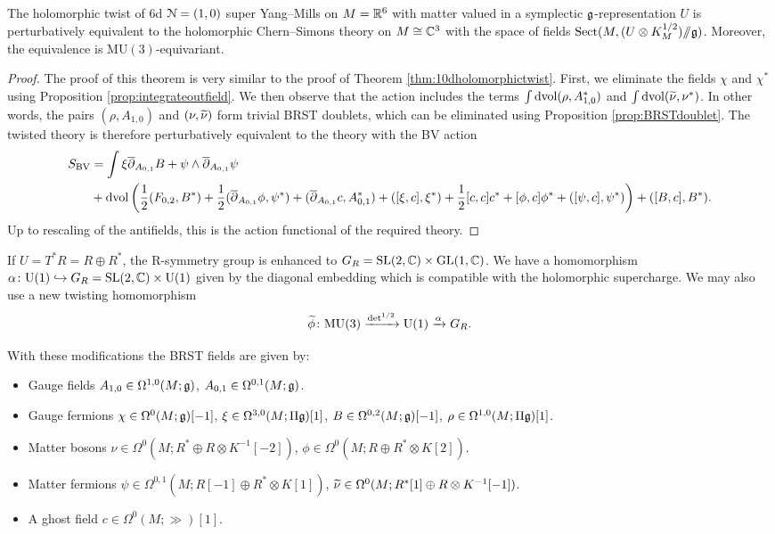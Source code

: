 \documentclass[10pt, oneside]{article}
\newcommand{\MU}{\mathrm{MU}}
\newcommand{\Sect}{\mathrm{Sect}}
\renewcommand{\U}{\mathrm{U}}
\newcommand{\ham}{/\!\!/}
\begin{document}
\begin{theorem}
The holomorphic twist of 6d $\mathcal N=(1, 0)$ super Yang--Mills on $M=\mathbb R^6$ with matter valued in a symplectic $\mathfrak g$-representation $U$ is perturbatively equivalent to the holomorphic Chern--Simons theory on $M\cong \mathbb C^3$ with the space of fields $\Sect(M, (U\otimes K_M^{1/2})\ham \fg)$. Moreover, the equivalence is $\MU(3)$-equivariant.
\label{thm:6dholomorphictwist}
\end{theorem}
\begin{proof}
The proof of this theorem is very similar to the proof of Theorem \ref{thm:10dholomorphictwist}. First, we eliminate the fields $\chi$ and $\chi^*$ using Proposition \ref{prop:integrateoutfield}.  We then observe that the action includes the terms $\int \operatorname{dvol}  (\rho, A_{1,0}^*)$ and $\int \operatorname{dvol} (\widetilde{\nu}, \nu^*)$.  In other words, the pairs $(\rho, A_{1,0})$ and $(\nu, \widetilde{\nu})$ form trivial BRST doublets, which can be eliminated using Proposition \ref{prop:BRSTdoublet}. The twisted theory is therefore perturbatively equivalent to the theory with the BV action 
\begin{align*}
 S_{\mathrm{BV}} &= \int \xi \overline{\partial}_{A_{0,1}} B  + \psi \wedge \overline{\partial}_{A_{0,1}} \psi \\
 &+ \operatorname{dvol}\left(\frac 12 (F_{0,2}, B^*) + \frac 12 (\overline{\partial}_{A_{0,1}} \phi, \psi^*) +  (\overline{\partial}_{A_{0, 1}} c, A_{0, 1}^*) + ([\xi, c], \xi^*) + \frac{1}{2}[c, c]c^* +  [\phi, c] \phi^* + ([\psi, c],\psi^*)\right) + ([B, c], B^*) .
\end{align*}
Up to rescaling of the antifields, this is the action functional of the required theory.
\end{proof}

If $U=T^*R=R\oplus R^*$, the R-symmetry group is enhanced to $G_R=\mathrm{SL}(2, \mathbb C)\times \mathrm{GL}(1, \mathbb C)$. We have a homomorphism $\alpha\colon \U(1)\hookrightarrow G_R=\SL(2, \CC)\times \U(1)$ given by the diagonal embedding which is compatible with the holomorphic supercharge. We may also use a new twisting homomorphism
\[\Tilde{\phi}\colon\MU(3)\xrightarrow{\det^{1/2}}\U(1)\xrightarrow{\alpha} G_R.\]

With these modifications the BRST fields are given by:
\begin{itemize}
\item Gauge fields $A_{1, 0} \in \Omega^{1, 0}(M; \mathfrak g)$, $A_{0, 1}\in\Omega^{0, 1}(M; \mathfrak g)$.
\item Gauge fermions $\chi\in\Omega^0(M; \mathfrak g)[-1]$, $\xi\in\Omega^{3, 0}(M; \Pi\mathfrak g)[1]$, $B\in\Omega^{0, 2}(M; \mathfrak g)[-1]$, $\rho\in\Omega^{1, 0}(M; \Pi\mathfrak g)[1]$.
\item Matter bosons $\nu\in\Omega^0(M; R^*\oplus R\otimes K^{-1}[-2])$, $\phi\in\Omega^0(M; R\oplus R^*\otimes K[2])$.
\item Matter fermions $\psi\in \Omega^{0, 1}(M; R[-1]\oplus R^*\otimes K[1])$, $\widetilde{\nu}\in\Omega^0(M; R^*[1]\oplus R\otimes K^{-1}[-1])$.
\item A ghost field $c\in \Omega^0(M; \gg)[1]$.
\end{itemize}
\end{document}
